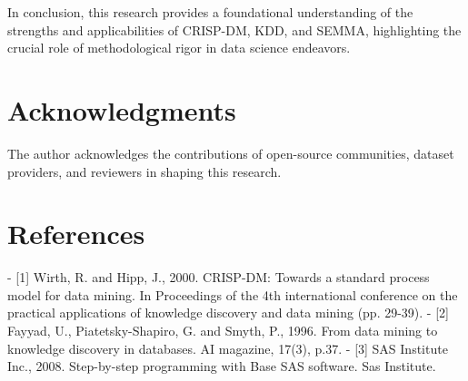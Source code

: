\documentclass{article}
\begin{document}
In conclusion, this research provides a foundational understanding of the strengths and applicabilities of CRISP-DM, KDD, and SEMMA, highlighting the crucial role of methodological rigor in data science endeavors.



\section{Acknowledgments}
The author acknowledges the contributions of open-source communities, dataset providers, and reviewers in shaping this research.

\section{References}
- [1] Wirth, R. and Hipp, J., 2000. CRISP-DM: Towards a standard process model for data mining. In Proceedings of the 4th international conference on the practical applications of knowledge discovery and data mining (pp. 29-39).
- [2] Fayyad, U., Piatetsky-Shapiro, G. and Smyth, P., 1996. From data mining to knowledge discovery in databases. AI magazine, 17(3), p.37.
- [3] SAS Institute Inc., 2008. Step-by-step programming with Base SAS software. Sas Institute.
\end{document}
